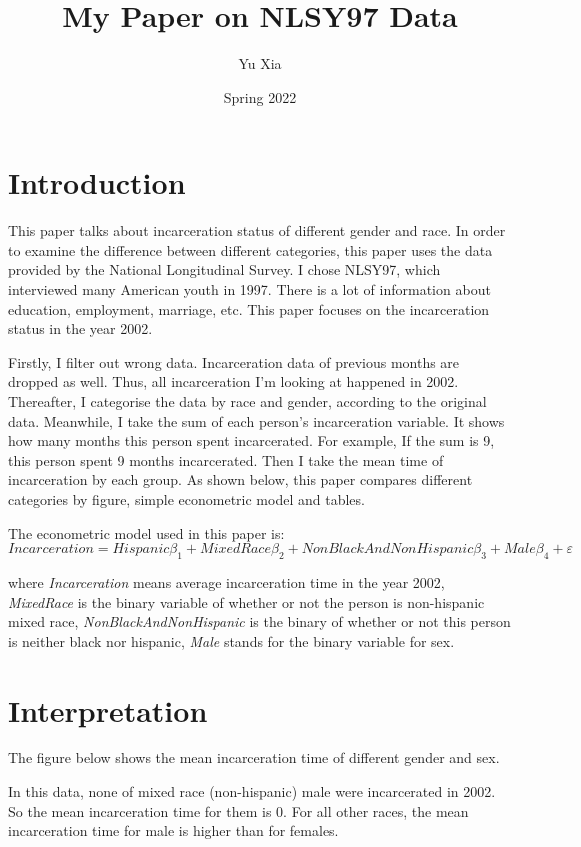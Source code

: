 \documentclass{article}
\author{Yu Xia}
\title{My Paper on NLSY97 Data}
\date{Spring 2022}
\begin{document}
\maketitle

\section{Introduction}

This paper talks about incarceration status of different gender and race. In order to examine the difference between different categories, this paper uses the data provided by the National Longitudinal Survey. I chose NLSY97, which interviewed many American youth in 1997. There is a lot of information about education, employment, marriage, etc. This paper focuses on the incarceration status in the year 2002.

Firstly, I filter out wrong data. Incarceration data of previous months are dropped as well. Thus, all incarceration I'm looking at happened in 2002. Thereafter, I categorise the data by race and gender, according to the original data. Meanwhile, I  take the sum of each person's incarceration variable. It shows how many months this person spent incarcerated. For example, If the sum is 9, this person spent 9 months incarcerated. Then I take the mean time of incarceration by each group. As shown below, this paper compares different categories by figure, simple econometric model and tables. 

The econometric model used in this paper is:
$$
    Incarceration = Hispanic\beta_1 + Mixed Race\beta_2 + Non Black And Non Hispanic\beta_3 + Male\beta_4 + \varepsilon
$$

where \textit{Incarceration} means average incarceration time in the year 2002, \textit{MixedRace} is the binary variable of whether or not the person is non-hispanic mixed race, \textit{NonBlackAndNonHispanic} is the binary of whether or not this person is neither black nor hispanic, \textit{Male} stands for the binary variable for sex. 

\newpage

\section{Interpretation}

The figure below shows the mean incarceration time of different gender and sex. 

In this data, none of mixed race (non-hispanic) male were incarcerated in 2002. So the mean incarceration time for them is 0. For all other races, the mean incarceration time for male is higher than for females. 
\end{document}
